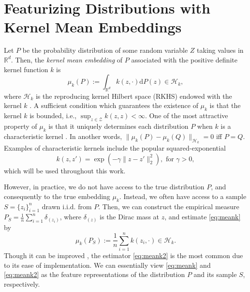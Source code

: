 \documentclass[twoside,11pt,a4paper]{article}
\begin{document}
\section{Featurizing Distributions with Kernel Mean Embeddings}
\label{sec:features}
Let $P$ be the probability distribution of some random variable $Z$ taking
values in $\mathbb{R}^d$.  Then, the \emph{kernel mean embedding} of $P$
associated with the positive definite kernel function $k$ is 
\begin{equation}
  \label{eq:meank}
  \mu_k(P) := \int_{\mathbb{R}^d} k(z, \cdot) \mathrm{d}P(z) \in
  \mathcal{H}_k,
\end{equation}
where $\mathcal{H}_k$ is the reproducing kernel Hilbert space (RKHS) endowed
with the kernel $k$ \citep{Berlinet04:RKHS,Smola07Hilbert}. A sufficient
condition which guarantees the existence of $\mu_k$ is that the kernel $k$ is
bounded, i.e., $\sup_{z\in\mathcal{Z}}k(z,z) < \infty$. One of the most
attractive property of $\mu_k$ is that it uniquely determines each distribution
$P$ when $k$ is a characteristic kernel \citep{Sriperumbudur10:Metrics}. In
another words,
$\|\mu_k(P)-\mu_k(Q)\|_{\mathcal{H}_k}=0$ iff $P=Q$. Examples of characteristic
kernels include the popular squared-exponential
\begin{equation}\label{eq:gauss}
  k(z,z') = \exp\left(-\gamma \|z- z'\|_2^2\right), \text{ for }
  \gamma >0,
\end{equation}
which will be used throughout this work.

However, in practice, we do not have access to the true
distribution $P$, and consequently to the true embedding $\mu_k$. Instead, we
often have access to a sample $S = \{z_i\}_{i=1}^n$
drawn i.i.d.  from $P$. Then, we can construct the empirical measure $P_S =
\frac{1}{n} \sum_{i=1}^n \delta_{(z_i)}$, where $\delta_{(z)}$ is the Dirac
mass at $z$, and estimate \eqref{eq:meank} by 
\begin{equation}
  \label{eq:meank2} 
  {\mu}_k(P_S) := \frac{1}{n} \sum_{i=1}^n k(z_i, \cdot) \in \mathcal{H}_k.
\end{equation}
Though it can be improved \citep{Muandet14:KMSE}, the estimator
\eqref{eq:meank2} is the most common due to its ease of implementation. We can
essentially view \eqref{eq:meank} and \eqref{eq:meank2} as the feature
representations of the distribution $P$ and its sample $S$, respectively. 
\end{document}
